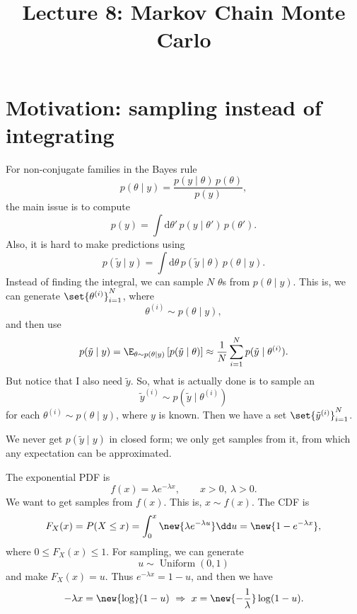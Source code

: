 
\title{Lecture 8: Markov Chain Monte Carlo}
\author{}\date{}


\maketitle

\section{Motivation: sampling instead of integrating}
For non-conjugate families in the Bayes rule
\[
p(\theta \mid y) = \frac{p(y \mid \theta)\,p(\theta)}{p(y)},
\]
the main issue is to compute
\[
p(y) = \int \mathrm{d}\theta'\,p(y \mid \theta')\,p(\theta').
\]
Also, it is hard to make predictions using
\[
p(\tilde y \mid y) = \int \mathrm{d}\theta\,p(\tilde y \mid \theta)\,p(\theta \mid y).
\]
Instead of finding the integral, we can sample $N$ $\theta$s from $p(\theta \mid y)$. This is, we can generate $\set{\theta^{(i)}}_{i=1}^{N}$, where
\[
\theta^{(i)} \sim p(\theta \mid y),
\]
and then use
\[
p(\tilde y \mid y) = \E_{\theta \sim p(\theta \mid y)}\left[p(\tilde y \mid \theta)\right] \approx \frac1N\sum_{i=1}^{N}p(\tilde y \mid \theta^{(i)}).
\]
But notice that I also need $\tilde y$. So, what is actually done is to sample an
\[
\tilde y^{(i)} \sim p(\tilde y \mid \theta^{(i)})
\]
for each $\theta^{(i)} \sim p(\theta \mid y)$, where $y$ is known. Then we have a set $\set{\tilde y^{(i)}}_{i=1}^{N}$.

We never get $p(\tilde y \mid y)$ in closed form; we only get samples from it, from which any expectation can be approximated.

\begin{example}
The exponential PDF is
\[
f(x) = \lambda e^{-\lambda x}, \qquad x > 0,\ \lambda > 0.
\]
We want to get samples from $f(x)$. This is, $x \sim f(x)$. The CDF is
\[
F_X(x) = P(X \le x) = \int_0^x \new{\lambda e^{-\lambda u}}\dd u = \new{1 - e^{-\lambda x}},
\]
where $0 \le F_X(x) \le 1$. For sampling, we can generate
\[
u \sim \operatorname{Uniform}(0,1)
\]
and make $F_X(x) = u$. Thus $e^{-\lambda x} = 1 - u$, and then we have
\[
-\lambda x = \new{\log}(1 - u) \ \Rightarrow\ x = \new{-\frac{1}{\lambda}}\log(1 - u).
\]
\end{example}

